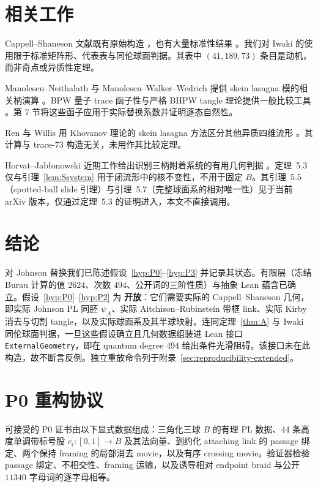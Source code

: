 \documentclass[11pt]{amsart}
\theoremstyle{definition}
\theoremstyle{remark}
\newcommand{\Open}{\textbf{开放}}
\begin{document}
\section{相关工作}

Cappell--Shaneson 文献既有原始构造 \cite{CappellShaneson1976,AitchisonRubinstein1984}，也有大量标准性结果 \cite{Akbulut2010,Gompf2010,KimYamada2017,Iwaki2024}。我们对 Iwaki 的使用限于标准矩阵形、代表表与同伦球面判据。其表中 $(41,189,73)$ 条目是动机，而非奇点或异质性定理。

Manolescu--Neithalath 与 Manolescu--Walker--Wedrich 提供 skein lasagna 模的相关柄演算 \cite{ManolescuNeithalath2020,ManolescuWalkerWedrich2023}。BPW 量子 trace 函子性与严格 BHPW tangle 理论提供一般比较工具 \cite{BeliakovaPutyraWehrli2019,BeliakovaHogancampPutyraWehrli2023}。第 7 节将这些函子应用于实际替换系数并证明逐态自然性。

Ren 与 Willis 用 Khovanov 理论的 skein lasagna 方法区分其他异质四维流形 \cite{RenWillis2024}。其计算与 trace-73 构造无关，未用作其比较定理。

Horvat--Jab\l{}onowski 近期工作给出识别三柄附着系统的有用几何判据 \cite{HorvatJablonowski2025}。定理~5.3 仅与引理~\ref{lem:Ssystem} 用于闭流形中的核不变性，不用于固定 $B$。其引理~5.5（spotted-ball slide 引理）与引理~5.7（完整球面系的相对唯一性）见于当前 arXiv 版本，仅通过定理~5.3 的证明进入，本文不直接调用。
\section{结论}

对 Johnson 替换我们已陈述假设~\ref{hyp:P0}--\ref{hyp:P3} 并记录其状态。有限层（冻结 Burau 计算的值 $2624$、次数 $494$、公开词的三阶性质）与抽象 Lean 蕴含已确立。假设~\ref{hyp:P0}--\ref{hyp:P2} 为 \Open：它们需要实际的 Cappell--Shaneson 几何，即实际 Johnson PL 同胚 $\psi_A$、实际 Aitchison--Rubinstein 带框 link、实际 Kirby 消去与切割 tangle，以及实际球面系及其半球映射。连同定理~\ref{thm:A} 与 Iwaki 同伦球面判据，一旦这些假设确立且几何数据组装进 Lean 接口 \texttt{ExternalGeometry}，即在 quantum degree $494$ 给出条件光滑阻碍。该接口未在此构造，故不断言反例。独立重放命令列于附录~\ref{sec:reproducibility-extended}。
\appendix


\section{P0 重构协议}\label{app:p0-reconstruction}

可接受的 P0 证书由以下显式数据组成：三角化三球 $B$ 的有理 PL 数据、44 条高度单调带标号股 $c_i:[0,1]\to B$ 及其法向量、到约化 attaching link 的 passage 绑定、两个保持 framing 的局部消去 movie，以及有序 crossing movie。验证器检验 passage 绑定、不相交性、framing 运输，以及诱导相对 endpoint braid 与公开 $11340$ 字母词的逐字母相等。
\end{document}
